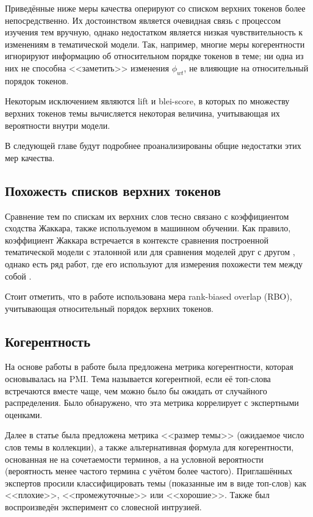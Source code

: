 Приведённые ниже меры качества оперируют со списком верхних токенов более непосредственно. Их достоинством является очевидная связь с процессом изучения тем вручную, однако недостатком является низкая чувствительность к изменениям в тематической модели. Так, например, многие меры когерентности игнорируют информацию об относительном порядке токенов в теме; ни одна из них не способна <<заметить>> изменения $\phi_{wt}$, не влияющие на относительный порядок токенов. 

Некоторым исключением являются lift и blei-score, в которых по множеству верхних токенов темы вычисляется некоторая величина, учитывающая их вероятности внутри модели.

В следующей главе будут подробнее проанализированы общие недостатки этих мер качества.

\subsection{Похожесть списков верхних токенов}
Сравнение тем по спискам их верхних слов тесно связано с коэффициентом сходства Жаккара, также используемом в машинном обучении. Как правило, коэффициент Жаккара встречается в контексте сравнения построенной тематической модели с эталонной \cite{greene14howmany} или для сравнения моделей друг с другом \cite{mantyla2018measuring}, однако есть ряд работ, где его используют для измерения похожести тем между собой \cite{bulatov,yanginferring}.

Стоит отметить, что в работе \cite{mantyla2018measuring} использована мера rank-biased overlap (RBO), учитывающая относительный порядок верхних токенов.

\subsection{Когерентность}
На основе работы \cite{rtl} в работе \cite{newman2010automatic} была предложена метрика когерентности, которая основывалась на PMI. Тема называется когерентной, если её топ-слова встречаются вместе чаще, чем можно было бы ожидать от случайного распределения. Было обнаружено, что эта метрика коррелирует с экспертными оценками.

Далее в статье \cite{mimno2011} была предложена метрика <<размер темы>> (ожидаемое число слов темы в коллекции), а также альтернативная формула для когерентности, основанная не на сочетаемости терминов, а на условной вероятности (вероятность менее частого термина с учётом более частого). Приглашённых экспертов просили классифицировать темы (показанные им в виде топ-слов) как <<плохие>>, <<промежуточные>> или <<хорошие>>. Также был воспроизведён эксперимент со словесной интрузией. 

